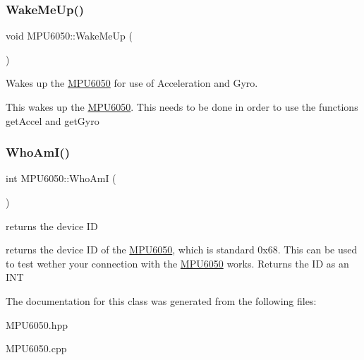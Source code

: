 \subsubsection{\texorpdfstring{Wake\+Me\+Up()}{WakeMeUp()}}
{\footnotesize\ttfamily void M\+P\+U6050\+::\+Wake\+Me\+Up (\begin{DoxyParamCaption}{ }\end{DoxyParamCaption})}



Wakes up the \hyperlink{classMPU6050}{M\+P\+U6050} for use of Acceleration and Gyro. 

This wakes up the \hyperlink{classMPU6050}{M\+P\+U6050}. This needs to be done in order to use the functions get\+Accel and get\+Gyro \mbox{\label{classMPU6050_ab33eb589ca8b001745611b1f12d389f6}} 
\subsubsection{\texorpdfstring{Who\+Am\+I()}{WhoAmI()}}
{\footnotesize\ttfamily int M\+P\+U6050\+::\+Who\+AmI (\begin{DoxyParamCaption}{ }\end{DoxyParamCaption})}



returns the device ID 

returns the device ID of the \hyperlink{classMPU6050}{M\+P\+U6050}, which is standard 0x68. This can be used to test wether your connection with the \hyperlink{classMPU6050}{M\+P\+U6050} works. Returns the ID as an I\+NT 

The documentation for this class was generated from the following files\+:\begin{DoxyCompactItemize}
\item 
M\+P\+U6050.\+hpp\item 
M\+P\+U6050.\+cpp\end{DoxyCompactItemize}
